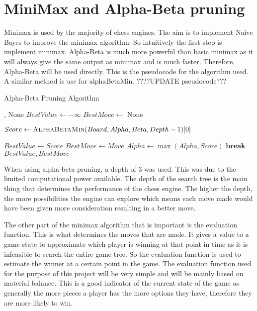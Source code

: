 \section{MiniMax and Alpha-Beta pruning}
Minimax is used by the majority of chess engines. The aim is to implement Naive Bayes to improve the minimax algorithm. So intuitively the first step is implement minimax. Alpha-Beta is much more powerful than basic minimax as it will always give the same output as minimax and is much faster. Therefore, Alpha-Beta will be used directly. This is the pseudocode for the algorithm used. A similar method is use for alphaBetaMin.
????UPDATE pseudocode???
\begin{algorithm}[h]
    \caption{Alpha-Beta Pruning Algorithm}
    \begin{algorithmic}
            \State \Return {}, None
        \EndIf
        \State $BestValue \gets -\infty$
        \State $BestMove \gets$ None

            \State {}
            \State $Score \gets \textsc{AlphaBetaMin}(Board, Alpha, Beta, Depth - 1)[0]$
            
                \State $BestValue \gets Score$
                \State $BestMove \gets Move$
                \State $Alpha \gets \max(Alpha, Score)$
            \EndIf
                \State \textbf{break}
            \EndIf
        \EndFor
        \State \Return $BestValue, BestMove$
        \EndFunction
    \end{algorithmic}
\end{algorithm}

When using alpha-beta pruning, a depth of 3 was used. This was due to the limited computational power available. The depth of the search tree is the main thing that determines the performance of the chess engine. The higher the depth, the more possibilities the engine can explore which means each move made would have been given more consideration resulting in a better move.

The other part of the minimax algorithm that is important is the evaluation function. This is what determines the moves that are made. It gives a value to a game state to approximate which player is winning at that point in time as it is infeasible to search the entire game tree. So the evaluation function is used to estimate the winner at a certain point in the game. The evaluation function used for the purpose of this project will be very simple and will be mainly based on material balance. This is a good indicator of the current state of the game as generally the more pieces a player has the more options they have, therefore they are more likely to win.

